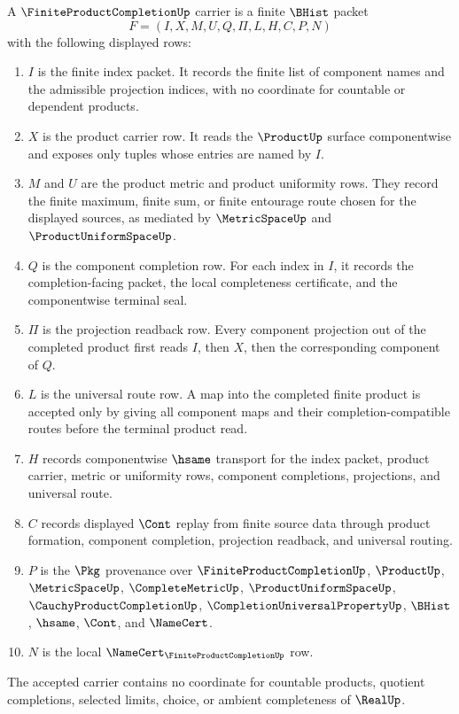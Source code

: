 \begin{definition}
\label{def:finite-product-completion-carrier}
A $\FiniteProductCompletionUp$ carrier is a finite $\BHist$ packet
$$
F=(I,X,M,U,Q,\Pi,L,H,C,P,N)
$$
with the following displayed rows:
\begin{enumerate}
\item $I$ is the finite index packet. It records the finite list of component names and the admissible projection indices, with no coordinate for countable or dependent products.
\item $X$ is the product carrier row. It reads the $\ProductUp$ surface componentwise and exposes only tuples whose entries are named by $I$.
\item $M$ and $U$ are the product metric and product uniformity rows. They record the finite maximum, finite sum, or finite entourage route chosen for the displayed sources, as mediated by $\MetricSpaceUp$ and $\ProductUniformSpaceUp$.
\item $Q$ is the component completion row. For each index in $I$, it records the completion-facing packet, the local completeness certificate, and the componentwise terminal seal.
\item $\Pi$ is the projection readback row. Every component projection out of the completed product first reads $I$, then $X$, then the corresponding component of $Q$.
\item $L$ is the universal route row. A map into the completed finite product is accepted only by giving all component maps and their completion-compatible routes before the terminal product read.
\item $H$ records componentwise $\hsame$ transport for the index packet, product carrier, metric or uniformity rows, component completions, projections, and universal route.
\item $C$ records displayed $\Cont$ replay from finite source data through product formation, component completion, projection readback, and universal routing.
\item $P$ is the $\Pkg$ provenance over $\FiniteProductCompletionUp$, $\ProductUp$, $\MetricSpaceUp$, $\CompleteMetricUp$, $\ProductUniformSpaceUp$, $\CauchyProductCompletionUp$, $\CompletionUniversalPropertyUp$, $\BHist$, $\hsame$, $\Cont$, and $\NameCert$.
\item $N$ is the local $\NameCert_{\FiniteProductCompletionUp}$ row.
\end{enumerate}
The accepted carrier contains no coordinate for countable products, quotient completions, selected limits, choice, or ambient completeness of $\RealUp$.
\end{definition}

